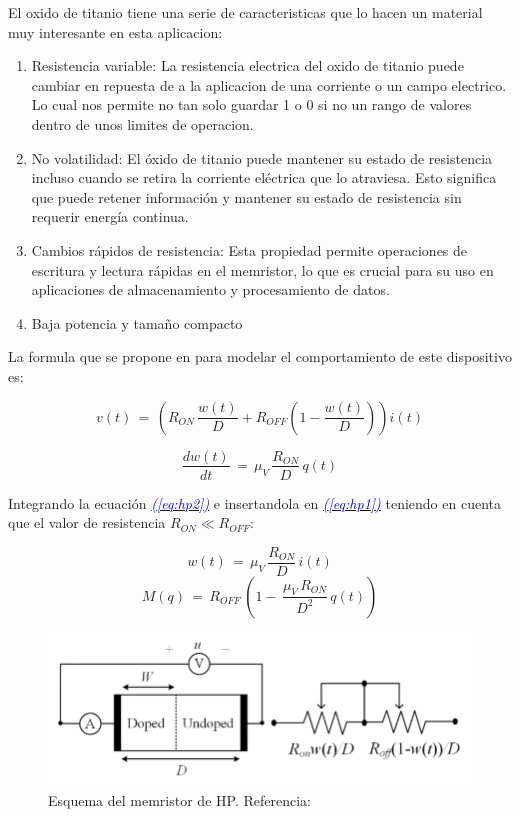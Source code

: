 \documentclass[12pt,a4paper]{report} %
\newcommand{\eref}[1]{\hyperref[#1]{\textcolor{blue}{\textit{(\ref*{#1})}}}}
\begin{document}
	El oxido de titanio tiene una serie de caracteristicas que lo hacen un material muy interesante en esta aplicacion:
	\begin{enumerate}
		\item Resistencia variable: La resistencia electrica del oxido de titanio puede cambiar en repuesta de a la aplicacion de una corriente o un campo electrico. Lo cual nos permite no tan solo guardar 1 o 0 si no un rango de valores dentro de unos limites de operacion.
		\item No volatilidad: El óxido de titanio puede mantener su estado de resistencia incluso cuando se retira la corriente eléctrica que lo atraviesa. Esto significa que puede retener información y mantener su estado de resistencia sin requerir energía continua.
		\item Cambios rápidos de resistencia:  Esta propiedad permite operaciones de escritura y lectura rápidas en el memristor, lo que es crucial para su uso en aplicaciones de almacenamiento y procesamiento de datos.
		\item Baja potencia y tamaño compacto
	\end{enumerate}
	\newpage
	
	La formula que se propone en \cite{HP} para modelar el comportamiento de este dispositivo es:
	
	\begin{equation}
		v(t)\,=\,\left(R_{ON}\,\frac{w(t)}{D}+R_{OFF}\left(1-\frac{w(t)}{D}\right)\right)i(t)
		\label{eq:hp1}
	\end{equation}
	
	\begin{equation}
		\frac{dw(t)}{dt}\,=\,\mu_V\,\frac{R_{ON}}{D}\,q(t)
		\label{eq:hp2}
	\end{equation}\smallskip
	
	Integrando la ecuación \eref{eq:hp2} e insertandola en \eref{eq:hp1} teniendo en cuenta que el valor de resistencia  $R_{ON} \ll R_{OFF}$: 
	
	\begin{equation}
		w(t)\,=\,\mu_V\,\frac{R_{ON}}{D}\,i(t)
		\label{eq:hp3}
	\end{equation}\smallskip
	\begin{equation}
		M(q)\,=\,R_{OFF}\,\left(1-\,\frac{\mu_V\,R_{ON}}{D^2}\,q(t)\right)
		\label{eq:hp4}
	\end{equation}\smallskip
	
	\begin{figure}[h]
		\centering
		\includegraphics[width=1\textwidth]{schmem.png}
		\caption{Esquema del memristor de HP. Referencia: \cite{2021}}
		\label{fig:2021}
	\end{figure}\smallskip
	
\end{document}
